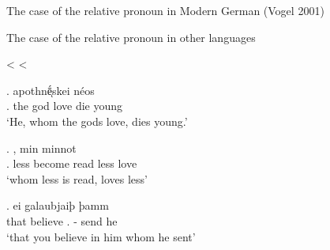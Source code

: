 \documentclass[xcolor=dvipsnames,10pt]{beamer}
\begin{document}
\begin{frame}[t]{The case of the relative pronoun in Modern German (Vogel 2001)}


\end{frame}



\begin{frame}[t]{The case of the relative pronoun in other languages}

\pause

\center
{} <  < 

\pause

\exg.     apothnḗͅskei néos\\
.\textcolor{LimeGreen}{} the god love\textcolor{LimeGreen}{\scsub{[acc]}} die\textcolor{Turquoise}{\scsub{[nom]}} young\\
`He, whom the gods love, dies young.' \label{ex:ag-nom-acc}

\pause

\exg.    , min minnot\\
.\textcolor{red}{} less become read\textcolor{red}{\scsub{[dat]}} less love\textcolor{Turquoise}{\scsub{[nom]}}\\
`whom less is read, loves less' \label{ex:ohg-nom-dat}

\pause

\exg. ei galaubjaiþ þamm   \\
that believe\textcolor{red}{\scsub{[dat]}} .\textcolor{red}{} - {send}\textcolor{LimeGreen}{\scsub{[acc]}} he\\
`that you believe in him whom he sent' \label{ex:gothic-dat-acc}

\end{frame}
\end{document}
